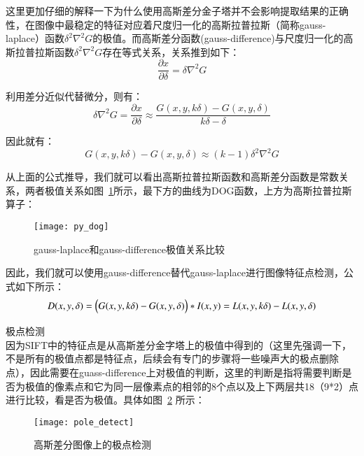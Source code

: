 \begin{compactenum}
这里更加仔细的解释一下为什么使用高斯差分金子塔并不会影响提取结果的正确性，在图像中最稳定的特征对应着尺度归一化的高斯拉普拉斯（简称gauss-laplace）函数${\delta}^2{\nabla}^2{G}$的极值。而高斯差分函数(gauss-difference)与尺度归一化的高斯拉普拉斯函数${\delta}^2{\nabla}^2{G}$存在等式关系，关系推到如下：
\begin{equation}\label{dog_1}
\frac{\partial{x}}{\partial{\delta}}=\delta\nabla^2G
\end{equation}

利用差分近似代替微分，则有：
\begin{equation}\label{dog_2}
\delta\nabla^2G=\frac{\partial{x}}{\partial{\delta}}\approx\frac{G(x,y,k\delta)-G(x,y,\delta)}{k\delta-\delta}
\end{equation}

因此就有：
\begin{equation}\label{dog_3}
G(x,y,k\delta)-G(x,y,\delta)\approx(k-1)\delta^2\nabla^2G
\end{equation}

从上面的公式推导，我们就可以看出高斯拉普拉斯函数和高斯差分函数是常数关系，两者极值关系如图~\ref{fig:py_dog}所示，最下方的曲线为DOG函数，上方为高斯拉普拉斯算子：
\begin{figure}[htp]
\centering
\texttt{[image: py\_dog]}
\caption{gauss-laplace和gauss-difference极值关系比较}
\label{fig:py_dog}
\end{figure}

因此，我们就可以使用gauss-difference替代gauss-laplace进行图像特征点检测，公式如下所示：
\begin{equation}\label{dog_detect}
D(x,y,\delta)=\Bigl(G(x,y,k\delta)-G(x,y,\delta)\Bigr)*I(x,y)=L(x,y,k\delta)-L(x,y,\delta)
\end{equation}

\item 极点检测\\因为SIFT中的特征点是从高斯差分金字塔上的极值中得到的（这里先强调一下，不是所有的极值点都是特征点，后续会有专门的步骤将一些噪声大的极点删除点），因此需要在guass-difference上对极值的判断，这里的判断是指将需要判断是否为极值的像素点和它为同一层像素点的相邻的8个点以及上下两层共18（9*2）点进行比较，看是否为极值。具体如图~\ref{fig:pole_detect} 所示：
\begin{figure}[htp]
\centering
\texttt{[image: pole\_detect]}
\caption{高斯差分图像上的极点检测}
\label{fig:pole_detect}
\end{figure}


\end{compactenum}
